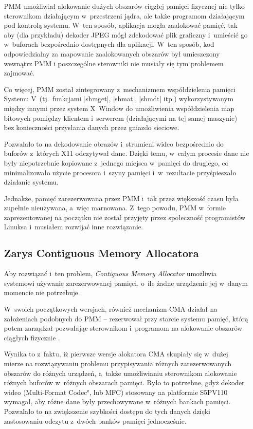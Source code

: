 PMM umożliwiał alokowanie dużych obszarów ciągłej pamięci fizycznej
nie tylko sterownikom działającym w~przestrzeni jądra, ale także
programom działającym pod kontrolą systemu.  W~ten sposób, aplikacja
mogła zaalokować pamięć, tak aby (dla przykładu) dekoder JPEG mógł
zdekodować plik graficzny i~umieścić go w~buforach bezpośrednio
dostępnych dla aplikacji.  W~ten sposób, kod odpowiedzialny za
mapowanie zaalokowanych obszarów był umieszczony wewnątrz PMM
i poszczególne sterowniki nie musiały się tym problemem zajmować.

Co więcej, PMM został zintegrowany z~mechanizmem współdzielenia
pamięci Systemu V~(tj.\ funkcjami \code|shmget|, \code|shmat|,
\code|shmdt| itp.) wykorzystywanym między innymi przez system X~Window
do umożliwienia współdzielenia map bitowych pomiędzy klientem
i~serwerem (działającymi na tej samej maszynie) bez konieczności
przysłania danych przez gniazdo sieciowe.

Pozwalało to na dekodowanie obrazów i~strumieni wideo bezpośrednio do
buforów z~których X11 odczytywał dane.  Dzięki temu, w~całym procesie
dane nie były niepotrzebnie kopiowane z~jednego miejsca w~pamięci do
drugiego, co minimalizowało użycie procesora i~szyny pamięci
i~w~rezultacie przyśpieszało działanie systemu.

Jednakże, pamięć zarezerwowana przez PMM i~tak przez większość czasu
była zupełnie nieużywana, a~więc marnowana.  Z~tego powodu, PMM
w~formie zaprezentowanej na początku nie został przyjęty przez
społeczność programistów Linuksa i~musiałem rozwijać inne rozwiązanie.

\subsection{Zarys Contiguous Memory Allocatora}

Aby rozwiązać i~ten problem, \textit{Contiguous Memory Allocator}
umożliwia systemowi używanie zarezerwowanej pamięci, o~ile żadne
urządzenie jej w~danym momencie nie potrzebuje.

W~swoich początkowych wersjach, również mechanizm CMA działał na
założeniach podobnych do PMM -- rezerwował przy starcie systemu
pamięć, którą potem zarządzał pozwalając sterownikom i~programom na
alokowanie obszarów ciągłych fizycznie \autocite{patch:cma-4}.

Wynika to z~faktu, iż pierwsze wersje alokatora CMA skupiały się
w~dużej mierze na rozwiązywaniu problemu przypisywania różnych
zarezerwowanych obszarów do różnych urządzeń, a~także umożliwianiu
sterownikom alokowanie różnych buforów w~różnych obszarach pamięci.
Było to potrzebne, gdyż dekoder wideo (\ang{Multi-Format Codec}, lub
MFC) stosowany na platformie S5PV110 wymagał, aby różne dane były
przechowywane w~różnych bankach pamięci.  Pozwalało to na zwiększenie
szybkości dostępu do tych danych dzięki zastosowaniu odczytu z~dwóch
banków pamięci jednocześnie.

